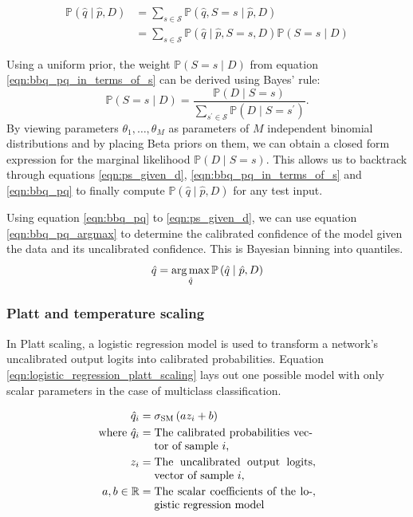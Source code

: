 \begin{align}
\label{eqn:bbq_pq}
\mathbb{P}\left(\hat{q} \mid \hat{p}, D\right) &= \sum_{s \in \mathcal{S}} \mathbb{P}\left(\hat{q}, S=s \mid \hat{p}, D\right) \\
\label{eqn:bbq_pq_in_terms_of_s}
&= \sum_{s \in \mathcal{S}} \mathbb{P}\left(\hat{q} \mid \hat{p}, S=s, D\right) \mathbb{P}(S=s \mid D)
\end{align}

Using a uniform prior, the weight $\mathbb{P}(S=s \mid D)$ from equation \ref{eqn:bbq_pq_in_terms_of_s} can be derived using Bayes' rule:
\begin{equation}
\label{eqn:ps_given_d}
\mathbb{P}(S=s \mid D)=\frac{\mathbb{P}(D \mid S=s)}{\sum_{s^{\prime} \in \mathcal{S}} \mathbb{P}\left(D \mid S=s^{\prime}\right)}.
\end{equation}
By viewing parameters $\theta_{1}, \ldots, \theta_{M}$ as parameters of $M$ independent binomial distributions and by placing Beta priors on them, we can obtain a closed form expression for the marginal likelihood $\mathbb{P}(D \mid S=s)$. This allows us to backtrack through equations \ref{eqn:ps_given_d}, \ref{eqn:bbq_pq_in_terms_of_s} and \ref{eqn:bbq_pq} to finally compute $\mathbb{P}\left(\hat{q} \mid \hat{p}, D\right)$ for any test input.

Using equation \ref{eqn:bbq_pq} to \ref{eqn:ps_given_d}, we can use equation \ref{eqn:bbq_pq_argmax} to determine the calibrated confidence of the model given the data and its uncalibrated confidence. This is Bayesian binning into quantiles.
\begin{equation}
\label{eqn:bbq_pq_argmax}
\hat{q} = \operatorname*{arg\,max}_{\hat{q}} \mathbb{P}\left(\hat{q} \mid \hat{p}, D\right)
\end{equation}

\subsubsection{Platt and temperature scaling}
\label{subsubsection_platt_temperature_scaling}
In Platt scaling, a logistic regression model is used to transform a network's uncalibrated output logits into calibrated probabilities. Equation \ref{eqn:logistic_regression_platt_scaling} lays out one possible model with only scalar parameters in the case of multiclass classification.

\begin{align}
\label{eqn:logistic_regression_platt_scaling}
\hat{q}_{i} &= \sigma_{\mathrm{SM}}\left(a z_{i} + b\right) \\ \nonumber
\text{where}~\hat{q}_{i} &= \parbox[t]{5cm}{The calibrated probabilities vector of sample $i$,} \\ \nonumber
z_{i} &= \parbox[t]{5cm}{The uncalibrated output logits vector of sample $i$,}, \\ \nonumber
a, b \in \mathbb{R} &= \parbox[t]{5cm}{The scalar coefficients of the logistic regression model}, \\ \nonumber
\end{align}

